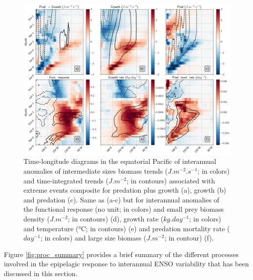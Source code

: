 
\begin{figure}[h!tp]
	\centering
	\includegraphics[scale=0.4]{figs/fig9.png}	
	\caption{Time-longitude diagrams in the equatorial Pacific of interannual anomalies of intermediate sizes biomass trends ($J.m^{-2}.s^{-1}$; in colors) and time-integrated trends ($J.m^{-2}$; in contours) associated with extreme \nino{} events composite for predation plus growth (a), growth (b) and predation (c). Same as (a-c) but for interannual anomalies of the functional response (no unit; in colors) and small prey biomass density ($J.m^{-2}$; in contours) (d), growth rate ($kg.day^{-1}$; in colors) and temperature (°C; in contours) (e) and predation mortality rate ($day^{-1}$; in colors) and large size biomass ($J.m^{-2}$; in contour) (f).}
	\label{fig:fig9}
\end{figure}

Figure \ref{fig:proc_summary} provides a brief summary of the different processes involved in the epipelagic response to interannual ENSO variability that has been discussed in this section.

